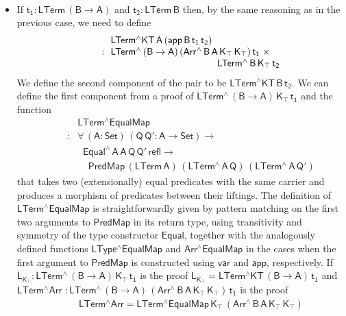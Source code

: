 \documentclass[sigplan,10pt]{acmart}
\begin{document}
\begin{itemize}
\[\begin{array}{ll}
\end{array}\]
\item If $\mathsf{t_1 : LTerm\,(B \to A)}$ and $\mathsf{t_2 :
  LTerm\,B}$ then, by the same reasoning as in the previous case, we
  need to define
  \[\begin{array}{ll}
 & \!\! \mathsf{LTerm^\wedge KT\,A\, (app\, B \, t_1\,t_2)}\\
\quad\quad : &\!\! \mathsf{LTerm^{\wedge}\, (B \to A)\, (Arr^{\wedge} \, B\, A\,
  K_\top \, K_\top)\, t_1\; \times}\\
 & \hspace*{1.5in} \mathsf{LTerm^{\wedge}\, B\, K_\top\, t_2}
  \end{array}\]
  We define the second component of the pair to be
  $\mathsf{LTerm^\wedge KT\,B\,t_2}$. We can define the first
  component from a proof of $\mathsf{LTerm^{\wedge}\, (B \to A)\,
    K_\top\, t_1}$ and the function
  \[\begin{array}{ll}
  & \!\! \mathsf{LTerm^\wedge EqualMap}\\
  \quad\quad : &
  \!\!\mathsf{\forall\, (A : Set)\, (Q\,Q' : A \to
    Set) \to}\\
  & \;\;\mathsf{Equal^\wedge\,A\,A\,Q\,Q'\,refl \to}\\
  &  \;\;\;\;\mathsf{PredMap\,(LTerm\,A)\,
    (LTerm^{\wedge}\,A\,Q)\,(LTerm^{\wedge}\,A\,Q')}
  \end{array}\] that takes two
  (extensionally) equal predicates with the same carrier and produces
  a morphism of predicates between their liftings. The definition of
  $\mathsf{LTerm^\wedge EqualMap}$ is straightforwardly given by
  pattern matching on the first two arguments to $\mathsf{PredMap}$ in
  its return type, using transitivity and symmetry of the type
  constructor $\mathsf{Equal}$, together with the analogously defined
  functions $\mathsf{LType^\wedge EqualMap}$ and $\mathsf{Arr^\wedge
    EqualMap}$ in the cases when the first argument to
  $\mathsf{PredMap}$ is constructed using $\mathsf{var}$ and
  $\mathsf{app}$, respectively. If $\mathsf{L_{K_\top} :
    LTerm^{\wedge}\, (B \to A) \, K_\top\, t_1}$ is the proof
  $\mathsf{L_{K_\top} = LTerm^\wedge KT\, (B \to A)\, t_1}$ and
  $\mathsf{ LTerm^\wedge Arr}$ $\mathsf{: LTerm^{\wedge}\, (B \to A)\,
    (Arr^{\wedge} \, B\, A\, K_\top \, K_\top)\, t_1}$ is the proof
  \[\begin{array}{l}
   \quad\quad  \mathsf{LTerm^\wedge Arr = LTerm^\wedge
    EqualMap\,K_\top\,(Arr^{\wedge}\,B\,A\,K_\top\,K_\top)}\\

\end{array}\]
\end{itemize}
\end{document}
